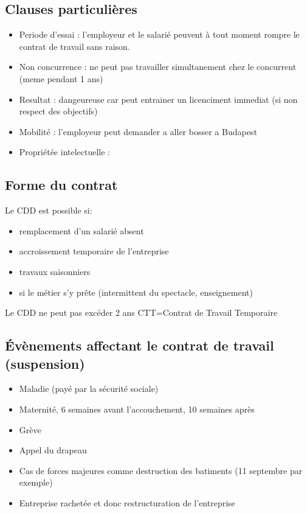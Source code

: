 \documentclass[12pt,a4paper,openany]{report}
\begin{document}
	\subsection{Clauses particulières}
	\begin{itemize}
		\item Periode d'essai : l'employeur et le salarié peuvent à tout moment rompre le contrat de travail sans raison.
		\item Non concurrence : ne peut pas travailler simultanement chez le concurrent (meme pendant 1 ans)
		\item Resultat : dangeureuse car peut entrainer un licenciment immediat (si non respect des objectifs)
		\item Mobilité : l'employeur peut demander a aller bosser a Budapest
		\item Propriétée intelectuelle : 
	\end{itemize}

	\subsection{Forme du contrat}
		Le CDD est  possible si: 
		\begin{itemize}
			\item remplacement d'un salarié absent
			\item accroissement temporaire de l'entreprise
			\item travaux saisonniers
			\item si le métier s'y prête (intermittent du spectacle, enseignement)
		\end{itemize}
			Le CDD ne peut pas excéder 2 ans
			CTT=Contrat de Travail Temporaire

			\subsection{Évènements affectant le contrat de travail (suspension)}
			\begin{itemize}
				\item Maladie (payé par la sécurité sociale)
				\item  Maternité, 6 semaines avant l'accouchement, 10 semaines après
				\item  Grève
				\item  Appel du drapeau
				\item Cas de forces majeures comme destruction des batiments (11 septembre par exemple)
				\item  Entreprise rachetée et donc restructuration de l'entreprise
			\end{itemize}
\end{document}
